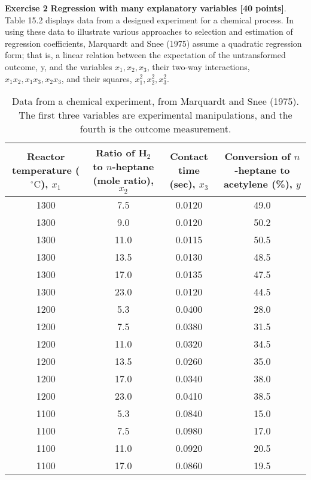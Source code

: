 \documentclass[11pt,notitlepage]{article}
\newcommand{\MBlue}[1]{{\color{MBlue}#1}}
\begin{document}
    \newpage
    \noindent
    \textbf{\large \MBlue{Exercise 2}}
    \vskip10pt
    \noindent
    \textbf{Regression with many explanatory variables [40 points]}. Table 15.2 displays data from a designed experiment for a chemical process. In using these data to illustrate various approaches
    to selection and estimation of regression coefficients, Marquardt and Snee (1975) assume
    a quadratic regression form; that is, a linear relation between the expectation of
    the untransformed outcome, y, and the variables $x_1,x_2,x_3$, their two-way interactions,
    $x_1x_2, x_1x_3, x_2x_3$, and their squares, $x_1^2, x_2^2, x_3^2$.
    \begin{table}[h!]
        \centering
        \caption{Data from a chemical experiment, from Marquardt and Snee (1975). The first three variables are experimental manipulations, and the fourth is the outcome measurement.}
        \begin{tabular}{cccc}
        \hline
        \makecell{Reactor temperature \\ (\(^\circ\text{C}\)), \(x_1\)} & 
        \makecell{Ratio of H\(_2\) to \\ \(n\)-heptane (mole ratio), \(x_2\)} & 
        \makecell{Contact time \\ (sec), \(x_3\)} & 
        \makecell{Conversion of \\ \(n\)-heptane to acetylene (\%), \(y\)} \\
        \hline
        1300 & 7.5  & 0.0120 & 49.0 \\
        1300 & 9.0  & 0.0120 & 50.2 \\
        1300 & 11.0 & 0.0115 & 50.5 \\
        1300 & 13.5 & 0.0130 & 48.5 \\
        1300 & 17.0 & 0.0135 & 47.5 \\
        1300 & 23.0 & 0.0120 & 44.5 \\
        1200 & 5.3  & 0.0400 & 28.0 \\
        1200 & 7.5  & 0.0380 & 31.5 \\
        1200 & 11.0 & 0.0320 & 34.5 \\
        1200 & 13.5 & 0.0260 & 35.0 \\
        1200 & 17.0 & 0.0340 & 38.0 \\
        1200 & 23.0 & 0.0410 & 38.5 \\
        1100 & 5.3  & 0.0840 & 15.0 \\
        1100 & 7.5  & 0.0980 & 17.0 \\
        1100 & 11.0 & 0.0920 & 20.5 \\
        1100 & 17.0 & 0.0860 & 19.5 \\
        \hline
        \end{tabular}
    \end{table}
\end{document}
